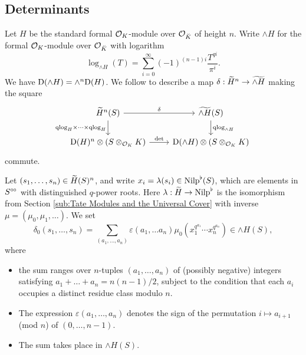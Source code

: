 \documentclass[../main.tex]{subfiles}
\begin{document}
\subsection{Determinants } %
\label{sub:Determinants}
Let $H$ be the standard formal $\cO_K$-module over $\cO_{\breve K}$ of height
$n$. Write $\wedge H$ for the formal $\cO_K$-module over $\cO_{\breve K}$ with
logarithm
\begin{equation*}
  \log_{\wedge H}(T) = \sum_{i = 0}^\infty (-1)^{(n-1)i} \frac{T^{qi}}{\pi^i}.
\end{equation*}
We have $\Dio(\wedge H) = \wedge^n \Dio(H)$. 
We follow \cite[Theorem 2.10.3]{BoyarchenkoWeinstein2011MaxVar} to describe a map $\delta:
\Tilde H^n \to \Tilde {\wedge H}$ making the square
\begin{equation}\label{diag:qlogsquare}
\begin{tikzcd}[ampersand replacement=\&]
	{\Tilde H^n(S)} \& {\Tilde{\wedge H}(S)} \\
	{\Dio(H)^n \otimes (S\otimes_{\cO_K} K)} \& {\Dio(\wedge H) \otimes(S\otimes_{\cO_K}K)}
	\arrow["\delta", from=1-1, to=1-2]
	\arrow["\qlog_H \times \dots \times \qlog_H"', from=1-1, to=2-1]
  \arrow["\qlog_{\wedge H}", from=1-2, to=2-2]
	\arrow["\det", from=2-1, to=2-2]
\end{tikzcd}
\end{equation}
commute. 

Let $(s_1, \dots, s_n) \in \Tilde H(S)^n$, and write $x_i = \lambda(s_i) \in
\Nilp^\flat(S)$, which are elements in $S^\cici$ with distinguished $q$-power
roots. Here $\lambda: \Tilde H \to \Nilp^\flat$ is the isomorphism from Section
\ref{sub:Tate Modules and the Universal Cover} with inverse $\mu = (\mu_0, \mu_1, \dots)$. 
We set
\begin{equation*}
  \delta_0(s_1, \dots, s_n) = \sum_{(a_1, \dots, a_n)} \varepsilon(a_1, \dots
  a_n) \mu_0(x_1^{q^{a_1}} \cdots x_n^{q^{a_n}}) \in \wedge H(S),
\end{equation*}
where 
\begin{itemize}
  \item the sum ranges over $n$-tuples $(a_1, \dots, a_n)$ of (possibly negative) integers 
    satisfying $a_1 + \dots + a_n = n (n-1)/2$, subject to the
    condition that each $a_i$ occupies a distinct residue class modulo $n$.
  \item The expression $\varepsilon(a_1, \dots, a_n)$ denotes the sign of the 
    permutation $i \mapsto a_{i+1}$ (mod $n$) of $(0, \dots, n-1)$.
  \item The sum takes place in ${\wedge H}(S)$.
\end{itemize}
\end{document}
